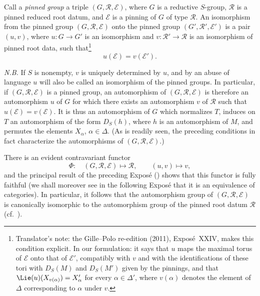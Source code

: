 Call a \emph{pinned group} a triple \((G,\mathscr R,\mathcal E)\),
where \(G\) is a reductive \(S\)-group, \(\mathscr R\) is a pinned
reduced root datum, and \(\mathcal E\) is a pinning of \(G\) of type
\(\mathscr R\). An isomorphism from the pinned group
\((G,\mathscr R,\mathcal E)\) onto the pinned group
\((G',\mathscr R',\mathcal E')\) is a pair \((u,v)\), where
\(u:G\to G'\) is an isomorphism and
\(v:\mathscr R'\to\mathscr R\) is an isomorphism of pinned root data,
such that\footnote{Translator's note: the Gille--Polo re-edition (2011), Exposé~XXIV, makes this condition explicit. In our
formulation: it says that \(u\) maps the maximal torus of \(\mathcal E\) onto that of
\(\mathcal E'\), compatibly with \(v\) and with the identifications of these tori with
\(D_S(M)\) and \(D_S(M')\) given by the pinnings, and that
\(\Lie(u)(X_{v(\alpha)})=X'_\alpha\) for every \(\alpha\in\Delta'\), where \(v(\alpha)\)
denotes the element of \(\Delta\) corresponding to \(\alpha\) under \(v\).}
\[
  u(\mathcal E)=v(\mathcal E').
\]

\textit{N.B.} If \(S\) is nonempty, \(v\) is uniquely determined by
\(u\), and by an abuse of language \(u\) will also be called an
isomorphism of the pinned groups. In particular, if
\((G,\mathscr R,\mathcal E)\) is a pinned group, an automorphism of
\((G,\mathscr R,\mathcal E)\) is therefore an automorphism \(u\) of
\(G\) for which there exists an automorphism \(v\) of \(\mathscr R\)
such that \(u(\mathcal E)=v(\mathcal E)\). It is thus an automorphism
of \(G\) which normalizes \(T\), induces on \(T\) an automorphism of
the form \(D_S(h)\), where \(h\) is an automorphism of \(M\), and
permutes the elements \(X_\alpha\), \(\alpha\in\Delta\).
\textup{(As is readily seen, the preceding conditions in fact
characterize the automorphisms of
\((G,\mathscr R,\mathcal E)\).)}

There is an evident contravariant functor
\[
  \Phi:\quad
  (G,\mathscr R,\mathcal E)\longmapsto\mathscr R,
  \qquad
  (u,v)\longmapsto v,
\]
and the principal result of the preceding Exposé
\textup{()} shows that this functor is fully faithful
\textup{(we shall moreover see in the following Exposé that it is an
equivalence of categories)}. In particular, it follows that the
automorphism group of \((G,\mathscr R,\mathcal E)\) is canonically
isomorphic to the automorphism group of the pinned root datum
\(\mathscr R\) \textup{(cf.\ )}.

